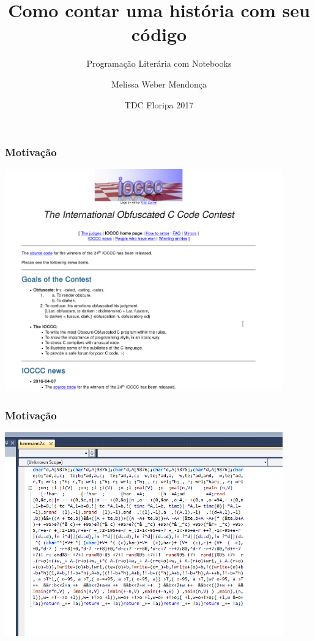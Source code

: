 \documentclass[10pt]{beamer}
\title{Como contar uma história com seu código}
\subtitle{Programação Literária com Notebooks}
\date{TDC Floripa 2017}
\author{Melissa Weber Mendonça}
\institute{UFSC}
\begin{document}
\maketitle

\begin{frame}
  \frametitle{Motivação}
  \begin{center}
    \includegraphics[width=0.9\textwidth]{imagens/obfuscated.png}
  \end{center}
\end{frame}

\begin{frame}
  \frametitle{Motivação}
  \begin{center}
  \includegraphics[width=0.9\textwidth]{imagens/ioccc.png}
  \end{center}
\end{frame}
\end{document}
